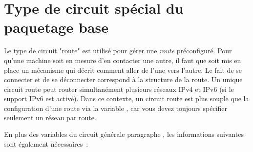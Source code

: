 
\section{Type de circuit spécial du paquetage base}


Le type de circuit "route" est utilisé pour gérer une \emph{route} préconfiguré.
Pour qu'une machine soit en mesure d'en contacter une autre, il faut que soit mis
en place un mécanisme qui décrit comment aller de l'une vers l'autre. Le fait de se
connecter et de se déconnecter correspond à la structure de la route. Un unique circuit
route peut router simultanément plusieurs réseaux IPv4 et IPv6 (si le support IPv6
est activé). Dans ce contexte, un circuit route est plus souple que la configuration
d'une route via la variable , car vous devez toujours spécifier
seulement un réseau par route.

En plus des variables du circuit générale paragraphe
, les informations suivantes sont
également nécessaires~:

